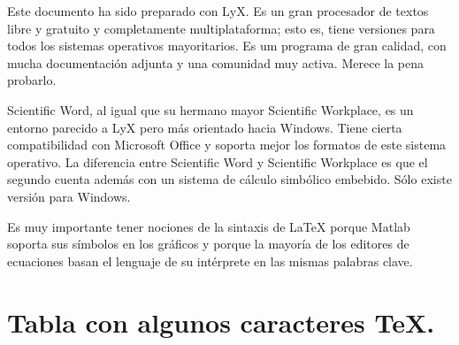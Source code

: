Este documento ha sido preparado con LyX. Es un gran procesador de
textos libre y gratuito y completamente multiplataforma; esto es,
tiene versiones para todos los sistemas operativos mayoritarios. Es um
programa de gran calidad, con mucha documentación adjunta y una
comunidad muy activa. Merece la pena probarlo.

Scientific Word, al igual que su hermano mayor Scientific Workplace,
es un entorno parecido a LyX pero más orientado hacia Windows.  Tiene
cierta compatibilidad con Microsoft Office y soporta mejor los
formatos de este sistema operativo. La diferencia entre Scientific
Word y Scientific Workplace es que el segundo cuenta además con un
sistema de cálculo simbólico embebido. Sólo existe versión para
Windows.

Es muy importante tener nociones de la sintaxis de \LaTeX{} porque
Matlab soporta sus símbolos en los gráficos y porque la mayoría de los
editores de ecuaciones basan el lenguaje de su intérprete en las
mismas palabras clave.


\section{Tabla con algunos caracteres \TeX{}.}

